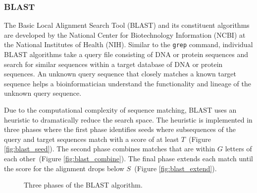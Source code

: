 \documentclass[conference,compsoc]{IEEEtran}
\begin{document}
\subsubsection{BLAST}

The Basic Local Alignment Search Tool (BLAST)\cite{BLAST} and its constituent algorithms are developed by the National Center for Biotechnology Information (NCBI) at the National Institutes of Health (NIH). Similar to the {\tt grep} command, individual BLAST algorithms take a query file consisting of DNA or protein sequences and search for similar sequences within a target database of DNA or protein sequences. An unknown query sequence that closely matches a known target sequence helps a bioinformatician understand the functionality and lineage of the unknown query sequence.



Due to the computational complexity of sequence matching, BLAST uses an heuristic to dramatically reduce the search space. The heuristic is implemented in three phases where the first phase identifies seeds where subsequences of the query and target sequences match with a score of at least $T$~(Figure \ref{fig:blast_seed}). The second phase combines matches that are within $G$ letters of each other~(Figure \ref{fig:blast_combine}). The final phase extends each match until the score for the alignment drops below $S$~(Figure \ref{fig:blast_extend}).


\begin{figure*}[!t]
\centering
{}
\hfil
{}
\hfil
{}
\caption{Three phases of the BLAST algorithm.}
\label{fig:blast_phases}
\end{figure*}
\end{document}
